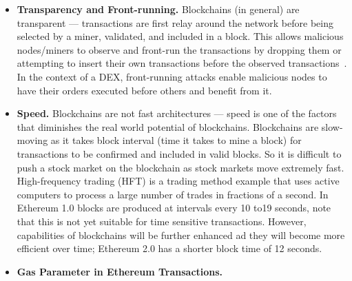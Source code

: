 \begin{itemize}

\item \textbf{Transparency and Front-running.} Blockchains (in general)  are transparent --- transactions are first relay around the network before being selected by a miner, validated, and included in a block. This allows malicious nodes/miners to observe and front-run the transactions by dropping them or attempting to insert their own transactions before the observed transactions~\cite{eskandari2019sok}. In the context of a DEX, front-running attacks enable malicious nodes to have their orders executed before others and benefit from it.


\item \textbf{Speed.} Blockchains are not fast architectures --- speed is one of the factors that diminishes the real world potential of blockchains. Blockchains are slow-moving as it takes block interval (\ie time it takes to mine a block) for transactions to be confirmed and included in valid blocks. So it is difficult to push a stock market on the blockchain as stock markets move extremely fast. High-frequency trading (HFT) is a trading method example that uses active computers to process a large number of trades in fractions of a second. In Ethereum 1.0 blocks are produced at intervals every 10 to19 seconds, note that this is not yet suitable for time sensitive transactions. However, capabilities of blockchains will be further enhanced ad they will become more efficient over time; Ethereum 2.0 has a shorter block time of 12 seconds. 

\item \textbf{Gas Parameter in Ethereum Transactions.} 


\end{itemize}
